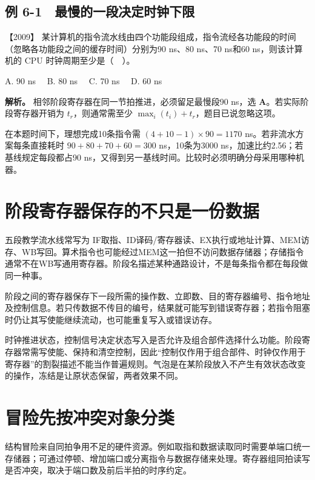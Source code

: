 \subsection{例 6-1　最慢的一段决定时钟下限}\label{co-ex6-1}

\noindent{}【2009】 某计算机的指令流水线由四个功能段组成，指令流经各功能段的时间（忽略各功能段之间的缓存时间）分别为90 ns、80 ns、70 ns和60 ns，则该计算机的 CPU 时钟周期至少是（　）。

A. 90 ns　 B. 80 ns　 C. 70 ns　 D. 60 ns


\textbf{解析。} 相邻阶段寄存器在同一节拍推进，必须留足最慢段90 ns，选 \textbf{A}。若实际阶段寄存器开销为 \(t_r\)，则通常需至少 \(\max_i(t_i)+t_r\)，题目已说忽略这项。

在本题时间下，理想完成10条指令需 \((4+10-1)\times90=1170\) ns。若非流水方案每条直接耗时 \(90+80+70+60=300\) ns，10条为3000 ns，加速比约2.56；若基线规定每段都占90 ns，又得到另一基线时间。比较时必须明确分母采用哪种机器。

\section{阶段寄存器保存的不只是一份数据}\label{co-06-02}

五段教学流水线常写为 IF取指、ID译码/寄存器读、EX执行或地址计算、MEM访存、WB写回。算术指令也可能经过MEM这一拍但不访问数据存储器；存储指令通常不在WB写通用寄存器。阶段名描述某种通路设计，不是每条指令都在每段做同一种事。

阶段之间的寄存器保存下一段所需的操作数、立即数、目的寄存器编号、指令地址及控制信息。若只传数据不传目的编号，结果就可能写到错误寄存器；若指令阻塞时仍让其写使能继续流动，也可能重复写入或错误访存。

时钟推进状态，控制信号决定状态写入是否允许及组合部件选择什么功能。阶段寄存器常需写使能、保持和清空控制，因此``控制仅作用于组合部件、时钟仅作用于寄存器''的割裂描述不能当作普遍规则。气泡是在某阶段放入不产生有效状态改变的操作，冻结是让原状态保留，两者效果不同。

\section{冒险先按冲突对象分类}\label{co-06-03}

结构冒险来自同拍争用不足的硬件资源。例如取指和数据读取同时需要单端口统一存储器；可通过停顿、增加端口或分离指令与数据存储来处理。寄存器组同拍读写是否冲突，取决于端口数及前后半拍的时序约定。

